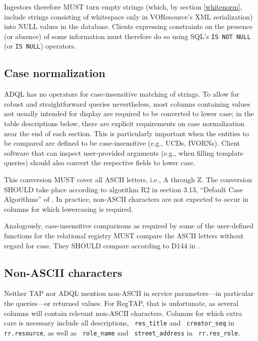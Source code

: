 \documentclass[11pt,a4paper]{ivoa}
\newcommand{\rtent}[1]{\texttt{\color{rtcolor} #1}}
\begin{document}
Ingestors therefore MUST turn empty strings (which, by section \ref{whitenorm}, include strings consisting of whitespace
only in VOResource's XML serialization) into NULL values in the
database.  Clients expressing constraints on the presence (or absence)
of some information must therefore do so using SQL's \texttt{IS NOT NULL}
(or \texttt{IS NULL}) operators.




\subsection{Case normalization}

\label{casenorm}

ADQL has no operators for case-insensitive matching of strings.  To
allow for robust and straightforward queries nevertheless, most columns
containing values not usually intended for display are required to be
converted to lower case; in the table descriptions below, there are
explicit requirements on case normalization near the end of each
section.  This is particularly important when the entities to be
compared are defined to be case-insensitive (e.g., UCDs, IVORNs).
Client software that can inspect user-provided arguments (e.g., when
filling template queries) should also convert the respective fields to
lower case.

This conversion MUST cover all ASCII letters, i.e., A through Z.  
The conversion SHOULD take place according to
algorithm R2 in section 3.13, ``Default Case Algorithms'' of 
\citep{std:UNICODE}.  In practice, non-ASCII characters are not expected
to occur in columns for which lowercasing is required.

Analogously, case-insensitive comparisons as required by some of the
user-defined functions for the relational registry MUST compare
the ASCII letters without regard for case.  They SHOULD compare according
to D144 in \citep{std:UNICODE}.




\subsection{Non-ASCII characters}

\label{utfreq}

Neither TAP nor ADQL mention non-ASCII in service parameters—in
particular the queries—or returned values.  For RegTAP, that is
unfortunate, as several columns will contain relevant non-ASCII
characters.  Columns for which extra care is necessary include all
descriptions, \rtent{res\_title} and \rtent{creator\_seq} in
\rtent{rr.resource}, as well as \rtent{role\_name} and
\rtent{street\_address} in \rtent{rr.res\_role}.
\end{document}
